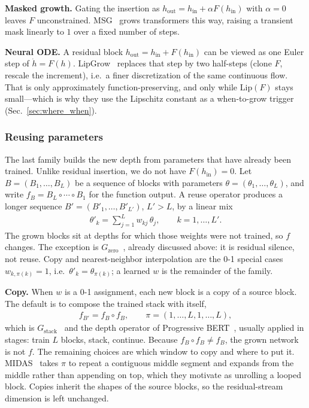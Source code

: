 \textbf{Masked growth.} Gating the insertion as $h_{\mathrm{out}}=h_{\mathrm{in}}+\alpha F(h_{\mathrm{in}})$ with $\alpha=0$ leaves $F$ unconstrained. MSG~\citep{yao_msg_2024} grows transformers this way, raising a transient mask linearly to $1$ over a fixed number of steps.

\textbf{Neural ODE.} A residual block $h_{\mathrm{out}}=h_{\mathrm{in}}+F(h_{\mathrm{in}})$ can be viewed as one Euler step of $\dot{h}=F(h)$. LipGrow~\citep{dong_towards_2020} replaces that step by two half-steps (clone $F$, rescale the increment), i.e.\ a finer discretization of the same continuous flow. That is only approximately function-preserving, and only while $\mathrm{Lip}(F)$ stays small---which is why they use the Lipschitz constant as a when-to-grow trigger (Sec.~\ref{sec:where_when}).

\subsubsection{Reusing parameters}

The last family builds the new depth from parameters that have already been trained. Unlike residual insertion, we do not have $F(h_{\mathrm{in}})=0$. Let $B=(B_1,\ldots,B_L)$ be a sequence of blocks with parameters $\theta=(\theta_1,\ldots,\theta_L)$, and write $f_B=B_L\circ\cdots\circ B_1$ for the function output. A reuse operator produces a longer sequence $B'=(B'_1,\ldots,B'_{L'})$, $L'>L$, by a linear mix
\begin{align}\label{eqn:reuse}
\theta'_k = \sum_{j=1}^{L} w_{kj}\,\theta_j, \qquad k=1,\ldots,L'.
\end{align}
The grown blocks sit at depths for which those weights were not trained, so $f$ changes. The exception is $G_{\mathrm{zero}}$~\citep{du_stacking_2024}, already discussed above: it is residual silence, not reuse. Copy and nearest-neighbor interpolation are the 0-1 special cases $w_{k,\pi(k)}=1$, i.e.\ $\theta'_k=\theta_{\pi(k)}$; a learned $w$ is the remainder of the family.

\textbf{Copy.} When $w$ is a 0-1 assignment, each new block is a copy of a source block. The default is to compose the trained stack with itself,
\begin{align}\label{eqn:gstack}
f_{B'} = f_B\circ f_B, \qquad \pi=(1,\ldots,L,1,\ldots,L),
\end{align}
which is $G_{\mathrm{stack}}$~\citep{du_stacking_2024} and the depth operator of Progressive BERT~\citep{gu_bert_2021}, usually applied in stages: train $L$ blocks, stack, continue. Because $f_B\circ f_B\neq f_B$, the grown network is not $f$. The remaining choices are which window to copy and where to put it. MIDAS~\citep{saunshi_inductive_2024} takes $\pi$ to repeat a contiguous middle segment and expands from the middle rather than appending on top, which they motivate as unrolling a looped block. Copies inherit the shapes of the source blocks, so the residual-stream dimension is left unchanged.

